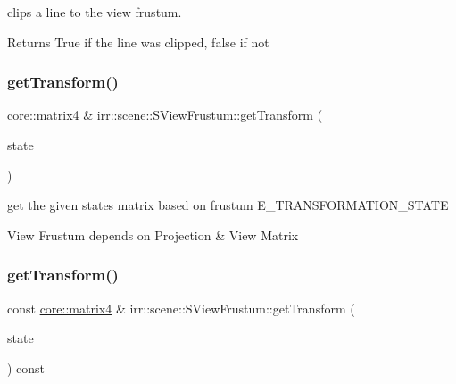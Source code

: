 clips a line to the view frustum. 

\begin{DoxyReturn}{Returns}
True if the line was clipped, false if not 
\end{DoxyReturn}
\mbox{\label{structirr_1_1scene_1_1SViewFrustum_acf8edd203e7479d2b444ed548075ffa6}} 
\subsubsection{\texorpdfstring{get\+Transform()}{getTransform()}\hspace{0.1cm}{\footnotesize\ttfamily [1/2]}}
{\footnotesize\ttfamily \hyperlink{namespaceirr_1_1core_a4c9d4e29899535971052810954a14431}{core\+::matrix4} \& irr\+::scene\+::\+S\+View\+Frustum\+::get\+Transform (\begin{DoxyParamCaption}\item[{\hyperlink{namespaceirr_1_1video_a15b57657a320243be03ae6f66fcff43d}{video\+::\+E\+\_\+\+T\+R\+A\+N\+S\+F\+O\+R\+M\+A\+T\+I\+O\+N\+\_\+\+S\+T\+A\+TE}}]{state }\end{DoxyParamCaption})\hspace{0.3cm}{\ttfamily [inline]}}



get the given state\textquotesingle{}s matrix based on frustum E\+\_\+\+T\+R\+A\+N\+S\+F\+O\+R\+M\+A\+T\+I\+O\+N\+\_\+\+S\+T\+A\+TE 

View Frustum depends on Projection \& View Matrix \mbox{\label{structirr_1_1scene_1_1SViewFrustum_a9afbd4a90f330de3fde6b534da3920f8}} 
\subsubsection{\texorpdfstring{get\+Transform()}{getTransform()}\hspace{0.1cm}{\footnotesize\ttfamily [2/2]}}
{\footnotesize\ttfamily const \hyperlink{namespaceirr_1_1core_a4c9d4e29899535971052810954a14431}{core\+::matrix4} \& irr\+::scene\+::\+S\+View\+Frustum\+::get\+Transform (\begin{DoxyParamCaption}\item[{\hyperlink{namespaceirr_1_1video_a15b57657a320243be03ae6f66fcff43d}{video\+::\+E\+\_\+\+T\+R\+A\+N\+S\+F\+O\+R\+M\+A\+T\+I\+O\+N\+\_\+\+S\+T\+A\+TE}}]{state }\end{DoxyParamCaption}) const\hspace{0.3cm}{\ttfamily [inline]}}




